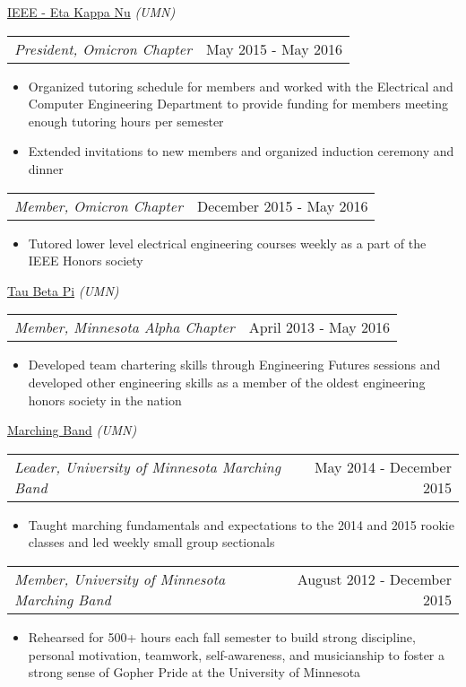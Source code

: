 \documentclass[10pt, letterpaper]{article}
\makeatletter
\newcommand{\headerrow}[2]
{\begin{tabular*}{\linewidth}{l@{\extracolsep{\fill}}r}
	#1 &
	#2 \\
\end{tabular*}}
\makeatother
\begin{document}
{\uline{IEEE - Eta Kappa Nu} \textit{(UMN)}

\headerrow
	{\quad\textit{President, Omicron Chapter}}
	{May 2015 - May 2016}
	\begin{itemize}
		\item Organized tutoring schedule for members and worked with the Electrical and Computer Engineering Department to provide funding for members meeting enough tutoring hours per semester
		\item Extended invitations to new members and organized induction ceremony and dinner
	\end{itemize}

\headerrow
	{\quad\textit{Member, Omicron Chapter}}
	{December 2015 - May 2016}
	\begin{itemize}
		\item Tutored lower level electrical engineering courses weekly as a part of the IEEE Honors society
	\end{itemize}

{\uline{Tau Beta Pi} \textit{(UMN)}

\headerrow
	{\quad\textit{Member, Minnesota Alpha Chapter}}
	{April 2013 - May 2016}
	\begin{itemize}
		\item Developed team chartering skills through Engineering
			Futures sessions and developed other engineering skills
			as a member of the oldest engineering honors society in the nation
	\end{itemize}

{\uline{Marching Band} \textit{(UMN)}}

\headerrow
	{\quad\textit{Leader, University of Minnesota Marching Band}}
	{May 2014 - December 2015}
	\begin{itemize}
		\item Taught marching fundamentals and expectations to the 2014
			and 2015 rookie classes and led weekly small group sectionals
	\end{itemize}

\headerrow
	{\quad\textit{Member, University of Minnesota Marching Band}}
	{August 2012 - December 2015}
	\begin{itemize}
		\item Rehearsed for 500+ hours each fall semester to build strong discipline, personal motivation, teamwork, self-awareness, and musicianship to foster a strong sense of Gopher Pride at the University of Minnesota
	\end{itemize}

}}
\end{document}
